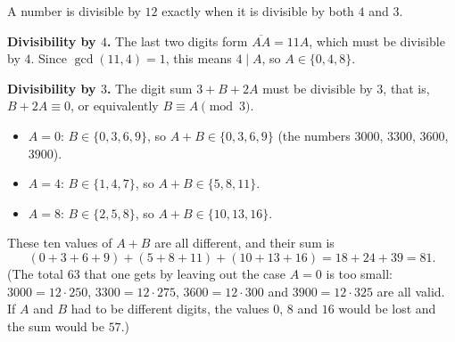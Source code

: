 A number is divisible by $12$ exactly when it is divisible by both $4$ and $3$.

\textbf{Divisibility by $4$.} The last two digits form $\overline{AA}=11A$, which must be divisible by $4$. Since $\gcd(11,4)=1$, this means $4\mid A$, so $A\in\{0,4,8\}$.

\textbf{Divisibility by $3$.} The digit sum $3+B+2A$ must be divisible by $3$, that is, $B+2A\equiv0$, or equivalently $B\equiv A\pmod3$.
\begin{itemize}
\item $A=0$: $B\in\{0,3,6,9\}$, so $A+B\in\{0,3,6,9\}$ (the numbers $3000$, $3300$, $3600$, $3900$).
\item $A=4$: $B\in\{1,4,7\}$, so $A+B\in\{5,8,11\}$.
\item $A=8$: $B\in\{2,5,8\}$, so $A+B\in\{10,13,16\}$.
\end{itemize}
These ten values of $A+B$ are all different, and their sum is
\[(0+3+6+9)+(5+8+11)+(10+13+16)=18+24+39=\boxed{81}.\]
(The total $63$ that one gets by leaving out the case $A=0$ is too small: $3000=12\cdot250$, $3300=12\cdot275$, $3600=12\cdot300$ and $3900=12\cdot325$ are all valid. If $A$ and $B$ had to be different digits, the values $0$, $8$ and $16$ would be lost and the sum would be $57$.)
